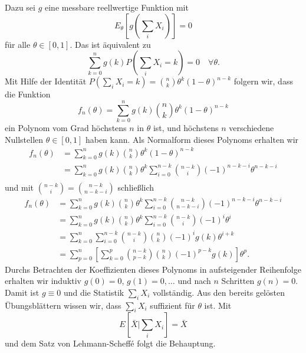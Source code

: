 Dazu sei $g$ eine messbare reellwertige Funktion mit
\begin{equation*}
	E_\theta \left[ g\left( \sum_{i}^{} X_i \right) \right] = 0 
\end{equation*}
für alle $\theta\in \left[ 0,1 \right]$. Das ist äquivalent zu
\begin{equation*}
	\sum_{k=0}^{n} g\left( k \right) P\left( \sum_{i}^{}X_i = k \right) = 0 \quad \forall\theta.
\end{equation*}
Mit Hilfe der Identität
$P\left( \sum_{i}^{} X_i = k \right)= \binom{n}{k}\theta^k \left( 1-\theta \right)^{n-k}$
folgern wir, dass die Funktion 
\begin{equation*}
	f_n(\theta ) = \sum_{k=0}^{n} g\left( k \right) \binom{n}{k}\theta^k \left( 1-\theta \right)^{n-k}
\end{equation*}
ein Polynom vom Grad höchstens $n$ in $\theta$ ist, und höchstens $n$
verschiedene Nullstellen $\theta\in \left[ 0,1 \right]$ haben kann. Als
Normalform dieses Polynoms erhalten wir
\begin{align*}
	f_n(\theta) 
	&= \sum_{k=0}^{n} g\left( k \right) \binom{n}{k}\theta^k \left( 1-\theta \right)^{n-k} \\ 
	&= \sum_{k=0}^{n} g\left( k \right) \binom{n}{k}\theta^k \sum_{i=0}^{n-k}\binom{n-k}{i}(-1)^{n-k-i}\theta^{n-k-i} \\
\end{align*}
und mit $\binom{n-k}{i}=\binom{n-k}{n-k-i}$ schließlich
\begin{align*}
	f_n(\theta) 
	&= \sum_{k=0}^{n} g\left( k \right) \binom{n}{k}\theta^k \sum_{i=0}^{n-k}\binom{n-k}{n-k-i}(-1)^{n-k-i}\theta^{n-k-i} \\
	&= \sum_{k=0}^{n} g\left( k \right) \binom{n}{k}\theta^k \sum_{i=0}^{n-k}\binom{n-k}{i}(-1)^i\theta^i \\
	&= \sum_{k=0}^{n} \sum_{i=0}^{n-k}\binom{n-k}{i} \binom{n}{k} (-1)^i  g\left( k \right)  \theta^{i+k} \\
	&= \sum_{p=0}^{n} \left[ \sum_{k=0}^{p} \binom{n-k}{p-k}\binom{n}{k}(-1)^{p-k} g(k) \right] \theta^p.
\end{align*}
Durchs Betrachten der Koeffizienten dieses Polynoms in aufsteigender Reihenfolge erhalten wir
induktiv $g(0)=0$, $g(1)=0,\ldots$ und nach $n$ Schritten $g(n)=0$.
Damit ist $g \equiv 0$ und die Statistik $\sum_{i}^{} X_i$
vollständig. Aus den bereits gelösten Übungsblättern wissen wir, dass $\sum_{i}^{} X_i$
suffizient für $\theta$ ist. Mit
\begin{equation*}
	E\left[ \bar X | \sum_{i}^{} X_i \right] = \bar X
\end{equation*}
und dem Satz von Lehmann-Scheff\'e folgt die Behauptung.






